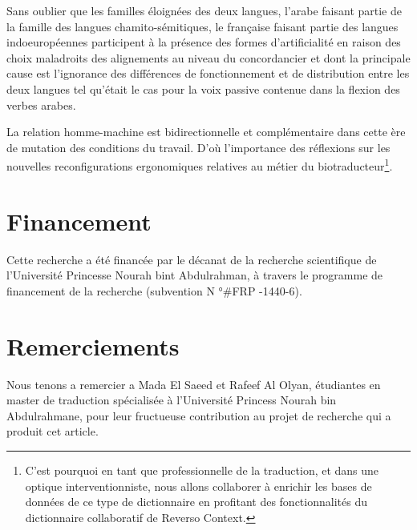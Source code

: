 \documentclass[french,english,brazil]{textolivre}
\begin{document}
Sans oublier que les familles éloignées des deux langues, l’arabe faisant partie de la famille des langues chamito-sémitiques, le française faisant partie des langues indoeuropéennes participent à la présence des formes d’artificialité en raison des choix maladroits des alignements au niveau du concordancier et dont la principale cause est l’ignorance des différences de fonctionnement et de distribution entre les deux langues tel qu’était le cas pour la voix passive contenue dans la flexion des verbes arabes.

La relation homme-machine est bidirectionnelle et complémentaire dans cette ère de mutation des conditions du travail. D’où l’importance des réflexions sur les nouvelles reconfigurations ergonomiques relatives au métier du biotraducteur\footnote{C’est pourquoi en tant que professionnelle de la traduction, et dans une optique interventionniste, nous allons collaborer à enrichir les bases de données de ce type de dictionnaire en profitant des fonctionnalités du dictionnaire collaboratif de Reverso Context.}.

\section*{Financement}
Cette recherche a été financée par le décanat de la recherche scientifique de l’Université Princesse Nourah bint Abdulrahman, à travers le programme de financement de la recherche (subvention N °\#FRP -1440-6).

\section*{Remerciements}
Nous tenons a remercier a Mada El Saeed et Rafeef Al Olyan, étudiantes en master de traduction spécialisée à l’Université Princess Nourah bin Abdulrahmane, pour leur fructueuse contribution au projet de recherche qui a produit cet article.

\begin{portuguese}
\printbibliography[title={Références}]
\end{portuguese}
\end{document}
